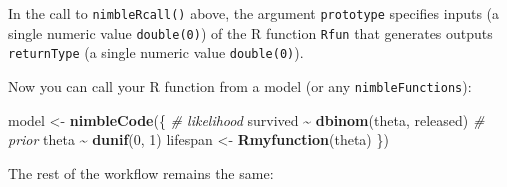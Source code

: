 \documentclass[
  12pt,
]{krantz}
\newenvironment{Shaded}{\begin{snugshade}}{\end{snugshade}}
\newcommand{\CommentTok}[1]{\textcolor[rgb]{0.56,0.35,0.01}{\textit{#1}}}
\newcommand{\DecValTok}[1]{\textcolor[rgb]{0.00,0.00,0.81}{#1}}
\newcommand{\FunctionTok}[1]{\textcolor[rgb]{0.13,0.29,0.53}{\textbf{#1}}}
\newcommand{\NormalTok}[1]{#1}
\newcommand{\OtherTok}[1]{\textcolor[rgb]{0.56,0.35,0.01}{#1}}
\newcommand{\SpecialCharTok}[1]{\textcolor[rgb]{0.81,0.36,0.00}{\textbf{#1}}}
\begin{document}
In the call to \texttt{nimbleRcall()} above, the argument \texttt{prototype} specifies inputs (a single numeric value \texttt{double(0)}) of the R function \texttt{Rfun} that generates outputs \texttt{returnType} (a single numeric value \texttt{double(0)}).

Now you can call your R function from a model (or any \texttt{nimbleFunctions}):

\begin{Shaded}
\begin{Highlighting}[]
\NormalTok{model }\OtherTok{\textless{}{-}} \FunctionTok{nimbleCode}\NormalTok{(\{}
  \CommentTok{\# likelihood}
\NormalTok{  survived }\SpecialCharTok{\textasciitilde{}} \FunctionTok{dbinom}\NormalTok{(theta, released)}
  \CommentTok{\# prior}
\NormalTok{  theta }\SpecialCharTok{\textasciitilde{}} \FunctionTok{dunif}\NormalTok{(}\DecValTok{0}\NormalTok{, }\DecValTok{1}\NormalTok{)}
\NormalTok{  lifespan }\OtherTok{\textless{}{-}} \FunctionTok{Rmyfunction}\NormalTok{(theta)}
\NormalTok{\})}
\end{Highlighting}
\end{Shaded}

The rest of the workflow remains the same:
\end{document}
